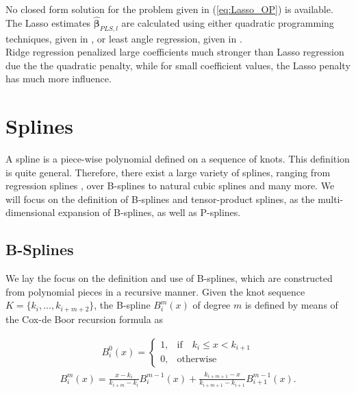 \documentclass[10pt,a4paper]{article}
\begin{document}
No closed form solution for the problem given in (\ref{eq:Lasso_OP}) is available. The Lasso estimates $\boldsymbol{\hat{\beta}}_{PLS,l}$ are calculated using either quadratic programming techniques, given in \cite{tibshirani1996lasso}, or least angle regression, given in \cite{efron2004leastangleregression}. \\

Ridge regression penalized large coefficients much stronger than Lasso regression due the the quadratic penalty, while for small coefficient values, the Lasso penalty has much more influence. \cite{tibshirani1996lasso}

\section{Splines} \label{sec:Splines}
	
A spline is a piece-wise polynomial defined on a sequence of knots. This definition is quite general. Therefore, there exist a large variety of splines, ranging from regression splines \cite{eubank1990regressionsplines}, over B-splines \cite{deBoor1978practicalGuideToSplines} to natural cubic splines and many more. We will focus on the definition of B-splines and tensor-product splines, as the multi-dimensional expansion of B-splines, as well as P-splines. \cite{deBoor1978practicalGuideToSplines} \cite{eilers1996flexible}
\subsection{B-Splines}

We lay the focus on the definition and use of B-splines, which are constructed from polynomial pieces in a recursive manner. Given the knot sequence $K = \{k_i, \dots, k_{i+m+2}\}$,  the B-spline $B_i^m(x)$ of degree $m$ is defined by means of the Cox-de Boor recursion formula as

\begin{align} \label{eq:Bspline_recDef1}
	B_i^0(x) = \begin{cases} 1, & \text{if} \quad k_i \le x < k_{i+1} \\ 
					 		 0, & \text{otherwise} 
	\end{cases}
\end{align}
\begin{align} \label{eq:Bspline_recDef2}
	B_i^m(x) = \frac{x - k_i}{k_{i+m} - k_i} B_i^{m-1}(x) + \frac{k_{i+m+1} - x}{k_{i+m+1} - k_{i+1}} B_{i+1}^{m-1}(x).
\end{align}
\end{document}
